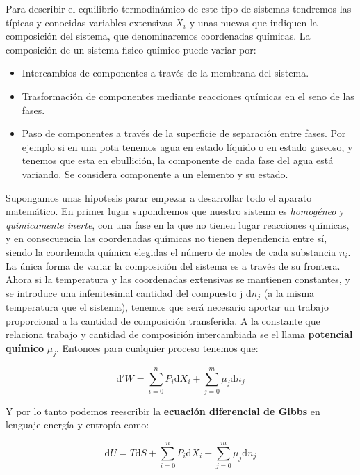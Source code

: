 \documentclass[12pt,a4paper]{article}
\newcommand{\D}{\mathrm{d}}
\begin{document}
Para describir el equilibrio termodinámico de este tipo de sistemas  tendremos las típicas y conocidas variables extensivas $X_i$ y unas nuevas que indiquen la composición del sistema, que denominaremos coordenadas químicas. La composición de un sistema fisico-químico puede variar por:

\begin{itemize}
\item Intercambios de componentes a través de la membrana del sistema.
\item Trasformación de componentes mediante reacciones químicas en el seno de las fases.
\item Paso de componentes a través de la superficie de separación entre fases. Por ejemplo si en una pota tenemos agua en estado líquido o en estado gaseoso, y tenemos que esta en ebullición, la componente de cada fase del agua está variando. Se considera componente a un elemento y su estado.
\end{itemize}

Supongamos unas hipotesis parar empezar a desarrollar todo el aparato matemático. En primer lugar supondremos que nuestro sistema es \textit{homogéneo} y \textit{químicamente inerte}, con una fase en la que no tienen lugar reacciones químicas, y en consecuencia las coordenadas químicas no tienen dependencia entre sí, siendo la coordenada química elegidas el número de moles de cada  substancia $n_i$. La única forma de variar la composición del sistema es a través de su frontera. Ahora si la temperatura y las coordenadas extensivas se mantienen constantes, y se introduce una infenitesimal cantidad del compuesto j $\D n_j$ (a la misma temperatura que el sistema), tenemos que será necesario aportar un trabajo proporcional a la cantidad de composición transferida. A la constante que relaciona trabajo y cantidad de composición intercambiada se el llama \textbf{potencial químico} $\mu_j$. Entonces para cualquier proceso tenemos que:

\begin{equation}
\D ' W = \sum_{i=0}^n P_i \D X_i + \sum_{j=0}^m \mu_j \D n_j
\end{equation}

Y por lo tanto podemos reescribir la \textbf{ecuación diferencial de Gibbs} en lenguaje energía y entropía como:

\begin{equation}
\D U  = T \D S + \sum_{i=0}^n P_i \D X_i + \sum_{j=0}^m \mu_j \D n_j 
\end{equation}
\end{document}

